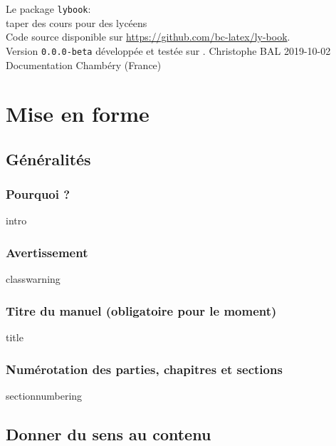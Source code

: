 \documentclass[12pt]{memoir}
\begin{document}
\buildfront
	{
		Le package \texttt{lybook}:
		\\
		taper des cours pour des lycéens
		\\
		{
			\footnotesize Code source disponible sur 
			\url{https://github.com/bc-latex/ly-book}.
		}
		\\
		{
			\footnotesize Version \texttt{0.0.0-beta} développée 
			et testée sur \macosxname{}.
		}
	}
	{Christophe BAL}
	{2019-10-02}
	{Documentation}
	{Chambéry (France)}



\part{Mise en forme}

\chapter{Généralités}

\section{Pourquoi ?}

{intro}




\section{Avertissement}

{classwarning}




\section{Titre du manuel (obligatoire pour le moment)}

{title}




\section{Numérotation des parties, chapitres et sections}

{sectionnumbering}




\chapter{Donner du sens au contenu}
\end{document}
